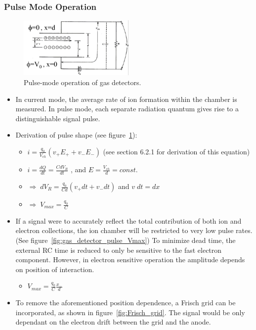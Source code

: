 \subsubsection{Pulse Mode Operation}
\begin{figure}[ht]
    \centering
    \includegraphics[width=0.5\textwidth]{images/gas_detector_pulse_mode.png}
    \caption{Pulse-mode operation of gas detectors.}
    \label{fig:gas_detector_pulse_mode}
\end{figure}
\begin{itemize}
    \item In current mode, the average rate of ion formation within the chamber is measured. In pulse mode, each separate radiation quantum gives rise to a distinguishable signal pulse. 
    \item Derivation of pulse shape (see figure~\ref{fig:gas_detector_pulse_mode}):
    \begin{itemize}
        \item[] $i=\frac{q_0}{V_{ch}}(v_+E_++v_-E_-)$ (see section 6.2.1 for derivation of this equation)
        \item[] $i=\frac{dQ}{dt}=\frac{CdV_R}{dt}$ , and $E=\frac{V_{ch}}{d}=const.$
        \item[] $\Rightarrow\;dV_R=\frac{q_0}{Cd}(v_+dt+v_-dt)$ and $v\;dt=dx$
        \item[] $\Rightarrow\;V_{max}=\frac{q_0}{C}$
    \end{itemize}
    \item If a signal were to accurately reflect the total contribution of both ion and electron collections, the ion chamber will be restricted to very low pulse rates. (See figure~\ref{fig:gas_detector_pulse_Vmax}) To minimize dead time, the external RC time is reduced to only be sensitive to the fast electron component. However, in electron sensitive operation the amplitude depends on position of interaction.  
    \begin{itemize}
        \item[] $V_{max}=\frac{q_0}{C}\frac{x_-}{d}$
    \end{itemize}
    \item To remove the aforementioned position dependence, a Frisch grid can be incorporated, as shown in figure~\ref{fig:Frisch_grid}. The signal would be only dependant on the electron drift between the grid and the anode. 
\end{itemize}
